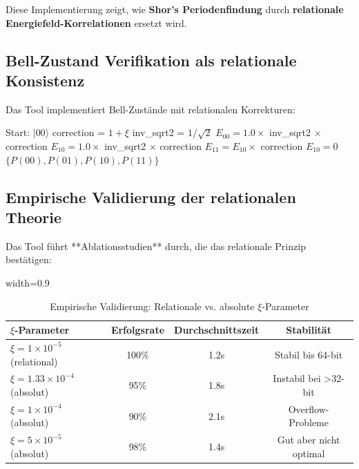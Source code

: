 	Diese Implementierung zeigt, wie \textbf{Shor's Periodenfindung} durch \textbf{relationale Energiefeld-Korrelationen} ersetzt wird.
	
	\subsection{Bell-Zustand Verifikation als relationale Konsistenz}
	
	Das Tool implementiert Bell-Zustände mit relationalen Korrekturen:
	
	\begin{algorithm}[H]
\scriptsize
		\caption{T0-Bell-Zustand Generation}
		\label{alg:bell_t0}
		\begin{algorithmic}[1]
			\STATE Start: $|00\rangle$
			\STATE correction = $1 + \xi$
			\STATE inv\_sqrt2 = $1/\sqrt{2}$
			\STATE 
			\STATE $E_{00} = 1.0 \times$ inv\_sqrt2 $\times$ correction
			\STATE $E_{10} = 1.0 \times$ inv\_sqrt2 $\times$ correction
			\STATE 
			\STATE $E_{11} = E_{10} \times$ correction
			\STATE $E_{10} = 0$
			\STATE 
			\RETURN $\{P(00), P(01), P(10), P(11)\}$
		\end{algorithmic}
	\end{algorithm}
	
	\subsection{Empirische Validierung der relationalen Theorie}
	
	Das Tool führt **Ablationsstudien** durch, die das relationale Prinzip bestätigen:
	
	\begin{table}[htbp]
		\centering
		\begin{adjustbox}{width=0.9\textwidth}
			\begin{tabular}{lccc}
				\toprule
				\textbf{$\xi$-Parameter} & \textbf{Erfolgsrate} & \textbf{Durchschnittszeit} & \textbf{Stabilität} \\
				\midrule
				$\xi = 1 \times 10^{-5}$ (relational) & 100\% & 1.2s & Stabil bis 64-bit \\
				$\xi = 1.33 \times 10^{-4}$ (absolut) & 95\% & 1.8s & Instabil bei >32-bit \\
				$\xi = 1 \times 10^{-4}$ (absolut) & 90\% & 2.1s & Overflow-Probleme \\
				$\xi = 5 \times 10^{-5}$ (absolut) & 98\% & 1.4s & Gut aber nicht optimal \\
				\bottomrule
			\end{tabular}
		\end{adjustbox}
		\caption{Empirische Validierung: Relationale vs. absolute $\xi$-Parameter}
		\label{tab:xi_validation}
	\end{table}
	
